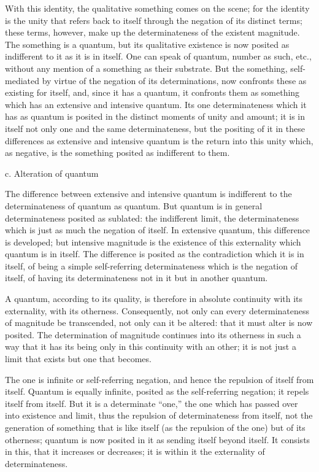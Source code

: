 With this identity, the qualitative something comes on the scene;
for the identity is the unity that refers back to itself
through the negation of its distinct terms;
these terms, however, make up the determinateness of
the existent magnitude.
The something is a quantum, but its qualitative existence is
now posited as indifferent to it as it is in itself.
One can speak of quantum, number as such, etc.,
without any mention of a something as their substrate.
But the something, self-mediated by virtue of the negation
of its determinations, now confronts these as existing for itself,
and, since it has a quantum, it confronts them as something
which has an extensive and intensive quantum.
Its one determinateness which it has as quantum
is posited in the distinct moments of unity and amount;
it is in itself not only one and the same determinateness,
but the positing of it in these differences as
extensive and intensive quantum is the return into this unity
which, as negative, is the something posited as indifferent to them.

c. Alteration of quantum

The difference between extensive and intensive quantum is
indifferent to the determinateness of quantum as quantum.
But quantum is in general
determinateness posited as sublated:
the indifferent limit, the determinateness
which is just as much the negation of itself.
In extensive quantum, this difference is developed;
but intensive magnitude is the existence of
this externality which quantum is in itself.
The difference is posited as the contradiction which it is in itself,
of being a simple self-referring determinateness
which is the negation of itself,
of having its determinateness not in it
but in another quantum.

A quantum, according to its quality, is therefore
in absolute continuity with its externality, with its otherness.
Consequently, not only can every determinateness of magnitude
be transcended, not only can it be altered:
that it must alter is now posited.
The determination of magnitude continues
into its otherness in such a way that
it has its being only in this continuity with an other;
it is not just a limit that exists but one that becomes.

The one is infinite or self-referring negation,
and hence the repulsion of itself from itself.
Quantum is equally infinite,
posited as the self-referring negation;
it repels itself from itself.
But it is a determinate “one,”
the one which has passed over into existence and limit,
thus the repulsion of determinateness from itself,
not the generation of something that is like itself
(as the repulsion of the one) but of its otherness;
quantum is now posited in it as sending itself beyond itself.
It consists in this, that it increases or decreases;
it is within it the externality of determinateness.

